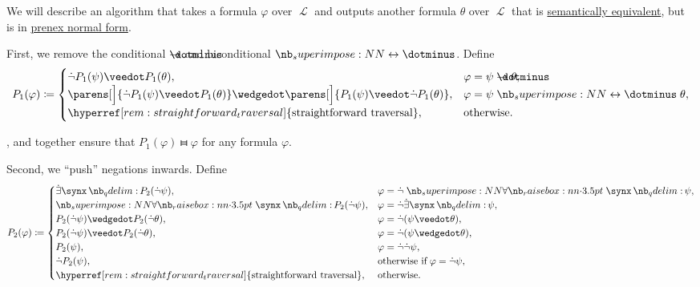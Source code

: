 \begin{algorithm}\label{alg:prenex_normal_form_conversion}
  We will describe an algorithm that takes a formula \( \varphi \) over \( \mscrL \) and outputs another formula \( \theta \) over \( \mscrL \) that is \hyperref[def:first_order_semantics/equivalence]{semantically equivalent}, but is in \hyperref[def:prenex_normal_form]{prenex normal form}.

  \begin{thmenum}
     First, we remove the conditional \( \synimplies \) and biconditional \( \syniff \). Define
    \begin{equation*}
      P_1(\varphi) \coloneqq \begin{cases}
        \synneg P_1(\psi) \synvee P_1(\theta),                                                                          &\varphi = \psi \synimplies \theta, \\
        \parens[\Big]{ \synneg P_1(\psi) \synvee P_1(\theta) } \synwedge \parens[\Big]{ P_1(\psi) \synvee \synneg P_1(\theta) }, &\varphi = \psi \syniff \theta, \\
        \hyperref[rem:straightforward_traversal]{\T{straightforward traversal}},                                  &\T{otherwise.}
      \end{cases}
    \end{equation*}

    ,  and  together ensure that \( P_1(\varphi) \gleichstark \varphi \) for any formula \( \varphi \).

     Second, we \enquote{push} negations inwards. Define
    \begin{equation*}
      P_2(\varphi) \coloneqq \begin{cases}
        \qexists \synx P_2(\synneg \psi),                                             &\varphi = \synneg \qforall \synx \psi, \\
        \qforall \synx P_2(\synneg \psi),                                             &\varphi = \synneg \qexists \synx \psi, \\
        P_2(\synneg \psi) \synwedge P_2(\synneg \theta),                                  &\varphi = \synneg (\psi \synvee \theta), \\
        P_2(\synneg \psi) \synvee P_2(\synneg \theta),                                    &\varphi = \synneg (\psi \synwedge \theta), \\
        P_2(\psi),                                                               &\varphi = \synneg \synneg \psi, \\
        \synneg P_2(\psi),                                                          &\T{otherwise if} \varphi = \synneg \psi, \\
        \hyperref[rem:straightforward_traversal]{\T{straightforward traversal}}, &\T{otherwise.}
      \end{cases}
    \end{equation*}


\end{thmenum}
\end{algorithm}
